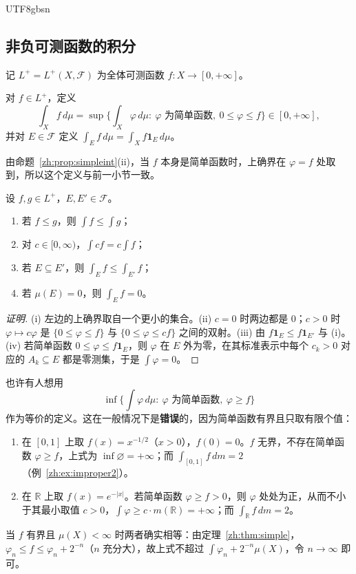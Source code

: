 \documentclass[11pt]{article}
\makeatletter
\newcommand{\envlabel}[1]{\protected@edef\@currentlabel{\themathenv}\label{#1}}
\makeatother
\begin{document}
\begin{CJK*}{UTF8}{gbsn}
\subsection{非负可测函数的积分}

记 $L^{+}=L^{+}(X,\mathcal{F})$ 为全体可测函数 $f:X\to[0,+\infty]$。

\begin{definition}
对 $f\in L^{+}$，定义
\[
\int_{X}f\,d\mu=\sup\Big\{\int_{X}\varphi\,d\mu:\ \varphi\text{ 为简单函数},\ 0\leq\varphi\leq f\Big\}\in[0,+\infty],
\]
并对 $E\in\mathcal{F}$ 定义 $\int_{E}f\,d\mu=\int_{X}f\mathbf{1}_{E}\,d\mu$。
\end{definition}

由命题~\ref{zh:prop:simpleint}(ii)，当 $f$ 本身是简单函数时，上确界在 $\varphi=f$ 处取到，所以这个定义与前一小节一致。

\begin{proposition}\envlabel{zh:prop:posbasic}
设 $f,g\in L^{+}$，$E,E'\in\mathcal{F}$。
\begin{enumerate}
  \item 若 $f\leq g$，则 $\int f\leq\int g$；
  \item 对 $c\in[0,\infty)$，$\int cf=c\int f$；
  \item 若 $E\subseteq E'$，则 $\int_{E}f\leq\int_{E'}f$；
  \item 若 $\mu(E)=0$，则 $\int_{E}f=0$。
\end{enumerate}
\end{proposition}

\begin{proof}[证明]
(i) 左边的上确界取自一个更小的集合。(ii) $c=0$ 时两边都是 $0$；$c>0$ 时 $\varphi\mapsto c\varphi$ 是 $\{0\leq\varphi\leq f\}$ 与 $\{0\leq\varphi\leq cf\}$ 之间的双射。(iii) 由 $f\mathbf{1}_{E}\leq f\mathbf{1}_{E'}$ 与 (i)。(iv) 若简单函数 $0\leq\varphi\leq f\mathbf{1}_{E}$，则 $\varphi$ 在 $E$ 外为零，在其标准表示中每个 $c_{k}>0$ 对应的 $A_{k}\subseteq E$ 都是零测集，于是 $\int\varphi=0$。
\end{proof}

\begin{remark}[关于“上积分”]\envlabel{zh:rem:upper}
也许有人想用
\[
\inf\Big\{\int\varphi\,d\mu:\ \varphi\text{ 为简单函数},\ \varphi\geq f\Big\}
\]
作为等价的定义。这在一般情况下是\textbf{错误}的，因为简单函数有界且只取有限个值：
\begin{enumerate}
  \item 在 $[0,1]$ 上取 $f(x)=x^{-1/2}$（$x>0$），$f(0)=0$。$f$ 无界，不存在简单函数 $\varphi\geq f$，上式为 $\inf\varnothing=+\infty$；而 $\int_{[0,1]}f\,dm=2$（例~\ref{zh:ex:improper2}）。
  \item 在 $\mathbb{R}$ 上取 $f(x)=e^{-|x|}$。若简单函数 $\varphi\geq f>0$，则 $\varphi$ 处处为正，从而不小于其最小取值 $c>0$，$\int\varphi\geq c\cdot m(\mathbb{R})=+\infty$；而 $\int_{\mathbb{R}}f\,dm=2$。
\end{enumerate}
当 $f$ 有界且 $\mu(X)<\infty$ 时两者确实相等：由定理~\ref{zh:thm:simple}，$\varphi_{n}\leq f\leq\varphi_{n}+2^{-n}$（$n$ 充分大），故上式不超过 $\int\varphi_{n}+2^{-n}\mu(X)$，令 $n\to\infty$ 即可。
\end{remark}


\end{CJK*}
\end{document}
